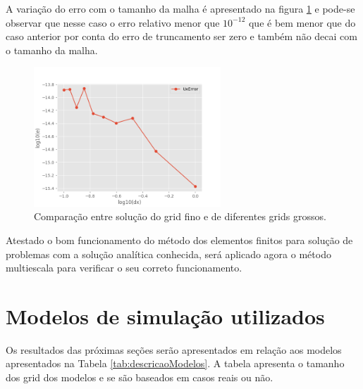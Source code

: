 A variação do erro com o tamanho da malha é apresentado na figura \ref{fig:SecondErrorTestSimpleShear} e pode-se observar que
nesse caso o erro relativo menor que $10^{-12}$ que é bem menor que do caso anterior por conta do erro de truncamento ser zero e também
não decai com o tamanho da malha.

\begin{figure}[!htbp]
    \label{fig:SecondErrorTestSimpleShear}
    \centering
    \includegraphics[width=7cm]{chap08/figs/SecondErrorTestSimpleShear.png}
    \caption{Comparação entre solução do grid fino e de diferentes grids grossos.}
\end{figure}

Atestado o bom funcionamento do método dos elementos finitos para solução de problemas com a solução
analítica conhecida, será aplicado agora o método multiescala para verificar o seu correto funcionamento.

\section{Modelos de simulação utilizados}

Os resultados das próximas seções serão apresentados em relação aos modelos apresentados na Tabela \ref{tab:descricaoModelos}. 
A tabela apresenta o tamanho dos grid dos modelos e se são baseados em casos reais ou não.


